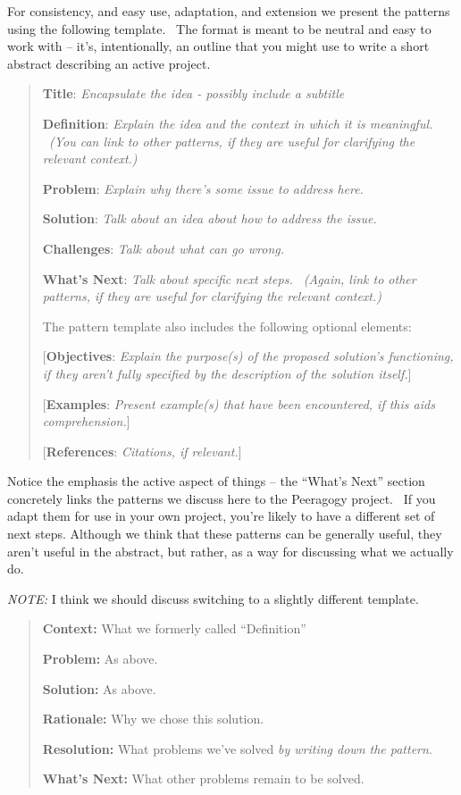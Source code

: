 For consistency, and easy use, adaptation, and extension we present
the patterns using the following template.~ The format is meant to be
neutral and easy to work with -- it's, intentionally, an outline that
you might use to write a short abstract describing an active project.

\begin{quote}
\textbf{Title}: \emph{Encapsulate the idea - possibly include a
subtitle}

\textbf{Definition}: \emph{Explain the idea and the context in which it
is meaningful. ~(You can link to other patterns, if they are useful for
clarifying the relevant context.)}

\textbf{Problem}: \emph{Explain why there's some issue to address here.}

\textbf{Solution}: \emph{Talk about an idea about how to address the
issue.}

\textbf{Challenges}: \emph{Talk about what can go wrong.}

\textbf{What's Next}: \emph{Talk about specific next steps. ~(Again,
link to other patterns, if they are useful for clarifying the relevant
context.)}

The pattern template also includes the following optional elements:

{[}\textbf{Objectives}: \emph{Explain the purpose(s) of the proposed
solution's functioning, if they aren't fully specified by the
description of the solution itself.}{]}

{[}\textbf{Examples}: \emph{Present example(s) that have been
encountered, if this aids comprehension.}{]}

{[}\textbf{References}: \emph{Citations, if relevant.}{]}
\end{quote}

Notice the emphasis the active aspect of things -- the ``What's Next''
section concretely links the patterns we discuss here to the Peeragogy
project.~ If you adapt them for use in your own project, you're likely
to have a different set of next steps. Although we think that these
patterns can be generally useful, they aren't useful in the abstract,
but rather, as a way for discussing what we actually do.

\emph{NOTE:} I think we should discuss switching to a slightly
different template.

\begin{quote}
\textbf{Context:} What we formerly called ``Definition''

\textbf{Problem:} As above.

\textbf{Solution:} As above.

\textbf{Rationale:} Why we chose this solution.

\textbf{Resolution:} What problems we've solved \emph{by writing down the pattern}.

\textbf{What's Next:} What other problems remain to be solved.
\end{quote}
